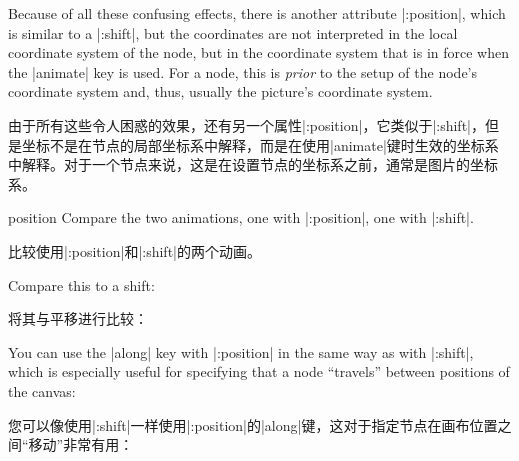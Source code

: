 Because of all these confusing effects, there is another attribute |:position|,
which is similar to a |:shift|, but the coordinates are not interpreted in the
local coordinate system of the node, but in the coordinate system that is in
force when the |animate| key is used. For a node, this is \emph{prior} to the
setup of the node's coordinate system and, thus, usually the picture's
coordinate system.

由于所有这些令人困惑的效果，还有另一个属性|:position|，它类似于|:shift|，但是坐标不是在节点的局部坐标系中解释，而是在使用|animate|键时生效的坐标系中解释。对于一个节点来说，这是在设置节点的坐标系之前，通常是图片的坐标系。

\begin{tikzanimateattribute}{position}
    Compare the two animations, one with |:position|, one with |:shift|.

    比较使用|:position|和|:shift|的两个动画。


\begin{codeexample}[
    preamble={\usetikzlibrary{animations}},
    animation list={0.5,1,1.5,2},
]
\end{codeexample}
    Compare this to a shift:
    
    将其与平移进行比较：


\begin{codeexample}[
    preamble={\usetikzlibrary{animations}},
    animation list={0.5,1,1.5,2},
]
\end{codeexample}
    You can use the |along| key with |:position| in the same way as with
    |:shift|, which is especially useful for specifying that a node ``travels''
    between positions of the canvas:
    
    您可以像使用|:shift|一样使用|:position|的|along|键，这对于指定节点在画布位置之间“移动”非常有用：


\begin{codeexample}[
    preamble={\usetikzlibrary{animations}},
    animation list={0.5,1,1.5,2},
]
\end{codeexample}
\end{tikzanimateattribute}


